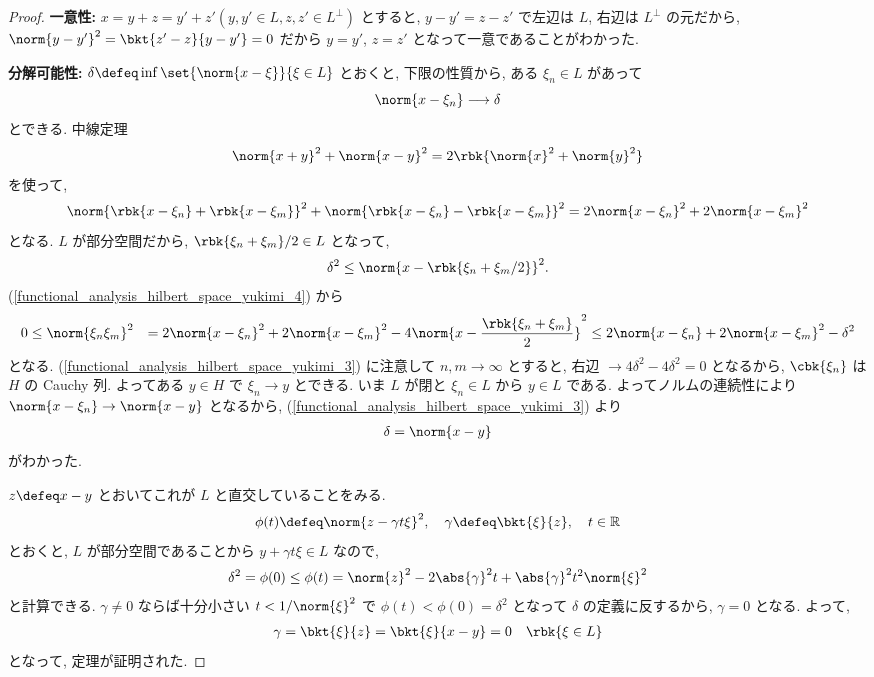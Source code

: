 \documentclass[openany, a4paper, oneside]{jsbook}
\begin{document}
\begin{proof}
\textbf{一意性:}
$x = y + z = y' + z' (y, y'\in L, z, z'\in L^{\perp})$ とすると,
$y - y' = z - z'$ で左辺は $L$, 右辺は $L^{\perp}$ の元だから,
$\norm{y - y'}^2 = \bkt{z' - z}{y - y'} = 0$ だから $y = y' $, $z = z'$ となって一意であることがわかった.

\textbf{分解可能性:}
$\delta \defeq \inf \set{\norm{x - \xi}}{\xi \in L}$ とおくと,
下限の性質から, ある $\xi_{n} \in L$ があって
\begin{equation}
 \norm{x - \xi_n}
 \longrightarrow
 \delta \label{functional_analysis_hilbert_space_yukimi_3}
\end{equation}
とできる.
中線定理
\begin{align}
 \norm{x + y}^2 + \norm{x - y}^2
 =
 2 \rbk{\norm{x}^2 + \norm{y}^2}
\end{align}
を使って,
\begin{equation}
 \norm{\rbk{x - \xi_n} + \rbk{x - \xi_m}}^2 + \norm{\rbk{x - \xi_n} - \rbk{x - \xi_m}}^2
 =
 2 \norm{x - \xi_n}^2 + 2 \norm{x - \xi_m}^2 \label{functional_analysis_hilbert_space_yukimi_4}
\end{equation}
となる.
$L$ が部分空間だから, $\rbk{\xi_{n} + \xi_{m}} / 2 \in L$ となって,
\begin{align}
 \delta^2
 \leq
 \norm{x - \rbk{\xi_{n} + \xi_{m}/2}}^2.
\end{align}
(\ref{functional_analysis_hilbert_space_yukimi_4}) から
\begin{align}
 0
 &\leq
 \norm{\xi_n \xi_m}^2
 &=
 2 \norm{x - \xi_n}^2 + 2 \norm{x - \xi_m}^2 - 4 \norm{x - \frac{\rbk{\xi_n + \xi_m}}{2}}^2
 \leq
 2 \norm{x - \xi_n} + 2 \norm{x - \xi_m}^2 - \delta^2
\end{align}
となる.
(\ref{functional_analysis_hilbert_space_yukimi_3}) に注意して
$n, m \to \infty$ とすると,
右辺 $\to 4 \delta^2 - 4\delta^2 = 0$ となるから,
$\cbk{\xi_{n}}$ は $H$ の Cauchy 列.
よってある $y \in H$ で $\xi_{n} \to y$ とできる.
いま $L$ が閉と $\xi_{n} \in L$ から $y \in L$ である.
よってノルムの連続性により $\norm{x - \xi_{n}} \to \norm{x - y}$ となるから,
(\ref{functional_analysis_hilbert_space_yukimi_3}) より
\begin{align}
 \delta
 =
 \norm{x - y}
\end{align}
がわかった.

$z \defeq x - y$ とおいてこれが $L$ と直交していることをみる.
\begin{align}
 \phi(t)
 \defeq
 \norm{z - \gamma t \xi}^2, \quad
 \gamma \defeq \bkt{\xi}{z}, \quad
 t\in \mathbb{R}
\end{align}
とおくと, $L$ が部分空間であることから $y + \gamma t\xi \in L$ なので,
\begin{align}
 \delta^2
 =
 \phi (0)
 \leq
 \phi (t)
 =
 \norm{z}^2 - 2 \abs{\gamma}^2 t + \abs{\gamma}^2 t^2 \norm{\xi}^2
\end{align}
と計算できる.
$\gamma \neq 0$ ならば十分小さい $t < 1 / \norm{\xi}^2$ で
$\phi (t) < \phi (0) = \delta^2$ となって $\delta$ の定義に反するから, $\gamma = 0$ となる.
よって,
\begin{align}
 \gamma
 =
 \bkt{\xi}{z}
 =
 \bkt{\xi}{x - y}
 =
 0 \quad \rbk{\xi \in L}
\end{align}
となって, 定理が証明された.
\end{proof}
\end{document}
